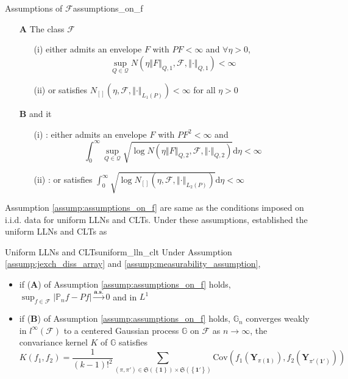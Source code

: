 \documentclass[twoside]{article}
\begin{document}
\begin{assumption}{Assumptions of $\mathcal{F}$}{assumptions_on_f}
    \begin{itemize}
        \item[\textbf{A}] The class $\mathcal{F}$  
        \begin{itemize}
            \item[(i)] either admits an envelope $F$ with $PF<\infty$ and $\forall \eta >0$, $$ \sup_{Q\in\mathcal{Q}}N\left( \eta\left\Vert F \right\Vert _{Q,1},\mathcal{F},\left\Vert \cdot \right\Vert _{Q,1} \right) <\infty $$ 
            \item[(ii)] or satisfies $N_{[]}\left(\eta,\mathcal{F},\left\Vert\cdot \right\Vert _{L_1\left(P\right)}\right)<\infty$ for all $\eta>0$ 
        \end{itemize}
        \item[\textbf{B}] and it 
        \begin{itemize}
            \item[(i)] : either admits an envelope $F$ with $PF^2<\infty$ and $$ \int^{\infty}_0 \sup_{Q\in\mathcal{Q}} \sqrt{\log N\left(\eta \left\Vert F \right\Vert _{Q,2},\mathcal{F},\left\Vert \cdot \right\Vert _{Q,2} \right)} \mathrm{d}\eta <\infty $$
            \item[(ii)] : or satisfies $\int^{\infty}_0 \sqrt{\log N_{[]} \left(\eta,\mathcal{F},\left\Vert \cdot \right\Vert _{L_2(P)}\right)} \mathrm{d}\eta < \infty$ 
        \end{itemize}
    \end{itemize}
\end{assumption}
Assumption \ref{assump:assumptions_on_f} are same as the conditions imposed on i.i.d. data for uniform LLNs and CLTs. Under these assumptions, \citet{davezies2021empirical} established the uniform LLNs and CLTs as 
\begin{theorem}{Uniform LLNs and CLTs}{uniform_lln_clt}
    Under Assumption \ref{assump:jexch_diss_array} and \ref{assump:measurability_assumption},
    \begin{itemize}
        \item if (\textbf{A}) of Assumption \ref{assump:assumptions_on_f} holds, $\sup_{f\in\mathcal{F}} \left\vert \mathbb{P}_nf - Pf \right\vert \xrightarrow{\mathbf{a.s.}} 0$ and in $L^1$
        \item if (\textbf{B}) of Assumption \ref{assump:assumptions_on_f} holds, $\mathbb{G}_n$ converges weakly in $l^{\infty}(\mathcal{F})$ to a centered Gaussian process $\mathbb{G}$ on $\mathcal{F}$ as $n\rightarrow \infty$, the convariance kernel $K$ of $\mathbb{G}$ satisfies 
        $$
        K(f_1,f_2) = \frac{1}{(k-1)!^2} \sum_{\left(\pi,\pi'\right) \in \mathfrak{S}\left(\left\{\mathbf{1}\right\}\right)\times \mathfrak{S}\left(\left\{\mathbf{1}'\right\}\right) }\mathrm{Cov}\left( f_1 \left(\mathbf{Y}_{\pi(\mathbf{1})}\right), f_2 \left(\mathbf{Y}_{\pi '(\mathbf{1}')}\right) \right)
        $$
    \end{itemize}
\end{theorem}
\end{document}
